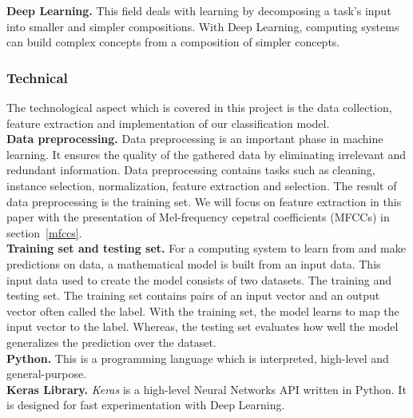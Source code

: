 \textbf{Deep Learning.} This field deals with learning by decomposing a task's
input into smaller and simpler compositions. With Deep Learning, computing
systems can build complex concepts from a composition of simpler concepts.

\subsubsection{Technical} The technological aspect which is covered in this
project is the data collection, feature extraction and implementation of our
classification model. \\

\textbf{Data preprocessing.} Data preprocessing is an important phase in machine
learning. It ensures the quality of the gathered data by eliminating irrelevant
and redundant information. Data preprocessing contains tasks such as cleaning,
instance selection, normalization, feature extraction and selection. The result
of data preprocessing is the training set. We will focus on feature extraction
in this paper with the presentation of Mel-frequency cepstral coefficients
(MFCCs) in section~\ref{mfccs}.\\


\textbf{Training set and testing set.} For a computing system to learn
from and make predictions on data, a mathematical model is built from an input
data. This input data used to create the model consists of two datasets. The
training and testing set. The training set contains pairs of an input vector and
an output vector often called the label. With the training set, the model learns
to map the input vector to the label. Whereas, the testing set evaluates how
well the model generalizes the prediction over the dataset.\\

\textbf{Python.} This is a programming language which is interpreted, high-level
and general-purpose.~\cite{Python}\\

\textbf{Keras Library.} \textit{Keras} is a high-level Neural Networks API
written in Python. It is designed for fast experimentation with Deep
Learning.~\cite{chollet2015keras}
